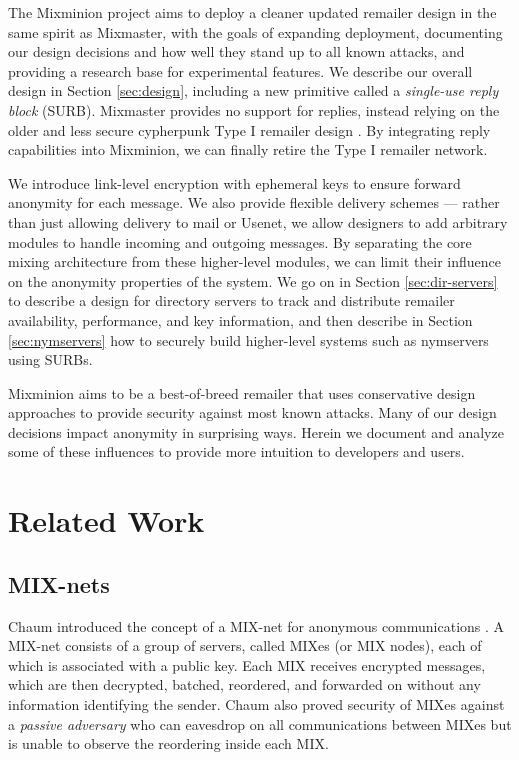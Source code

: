 \documentclass{llncs}
\begin{document}
The Mixminion project aims to deploy a cleaner updated remailer design
in the same spirit as Mixmaster, with the goals of expanding deployment,
documenting our design decisions and how well they stand up to all known
attacks, and providing a research base for experimental features. We
describe our overall design in Section \ref{sec:design}, including
a new primitive called a \emph{single-use reply block}
(SURB).  Mixmaster provides no support for replies, instead relying
on the older and less secure cypherpunk Type I remailer design
\cite{remailer-history}. By integrating reply capabilities into
Mixminion, we can finally retire the Type I remailer network.

We introduce link-level encryption with ephemeral keys to ensure forward
anonymity for each message. We also provide flexible delivery schemes ---
rather than just allowing delivery to mail or Usenet, we allow designers
to add arbitrary modules to handle incoming and outgoing messages. By
separating the core mixing architecture from these higher-level modules,
we can limit their influence on the anonymity properties of the system. We
go on in Section \ref{sec:dir-servers} to describe a design for directory
servers to track and distribute remailer availability, performance,
and key information, and then describe in Section \ref{sec:nymservers}
how to securely build higher-level systems such as nymservers using SURBs.

Mixminion aims to be a best-of-breed remailer that uses conservative
design approaches to provide security against most known attacks.
Many of our design decisions impact anonymity in surprising ways. Herein
we document and analyze some of these influences to provide more intuition
to developers and users.


\section{Related Work}

\subsection{MIX-nets}

Chaum introduced the concept of a MIX-net for anonymous communications
\cite{chaum-mix}. A MIX-net consists of a group of servers, called MIXes
(or MIX nodes), each of which is associated with a public key. Each
MIX receives encrypted messages, which are then decrypted, batched,
reordered, and forwarded on without any information identifying the
sender. Chaum also proved security of MIXes against a \emph{passive
adversary} who can eavesdrop on all communications between MIXes but is
unable to observe the reordering inside each MIX.
\end{document}
